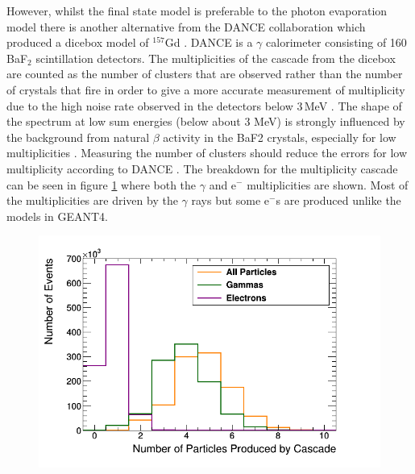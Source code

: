 
However, whilst the final state model is preferable to the photon evaporation model there is another alternative from the DANCE collaboration which produced a dicebox model of $^{157}$Gd \cite{Chyzh_2011}. DANCE is a $\gamma$ calorimeter consisting of 160 BaF$_2$ scintillation detectors. The multiplicities of the cascade from the dicebox are counted as the number of clusters that are observed rather than the number of crystals that fire in order to give a more accurate measurement of multiplicity due to the high noise rate observed in the detectors below 3\,MeV \cite{Chyzh_2011}. The shape of the spectrum at low sum energies (below about 3 MeV) is strongly influenced by the background from natural $\beta$ activity in the BaF2 crystals, especially for low multiplicities \cite{Chyzh_2011}. Measuring the number of clusters should reduce the errors for low multiplicity according to DANCE \cite{Chyzh_2011}. The breakdown for the multiplicity cascade can be seen in figure \ref{fig:gadoliniumMultipliciesBreakdownCascade} where both the $\gamma$ and e$^-$ multiplicities are shown. Most of the multiplicities are driven by the $\gamma$ rays but some e$^-$s are produced unlike the models in GEANT4. 

\begin{figure}[!h]
 \centering
 \includegraphics[width=0.7\linewidth]{Chapter4/Figs/Raster/gadolinium/gadoliniumMultipliciesBreakdownCascade.png}
 \label{fig:gadoliniumMultipliciesBreakdownCascade}
\end{figure}

